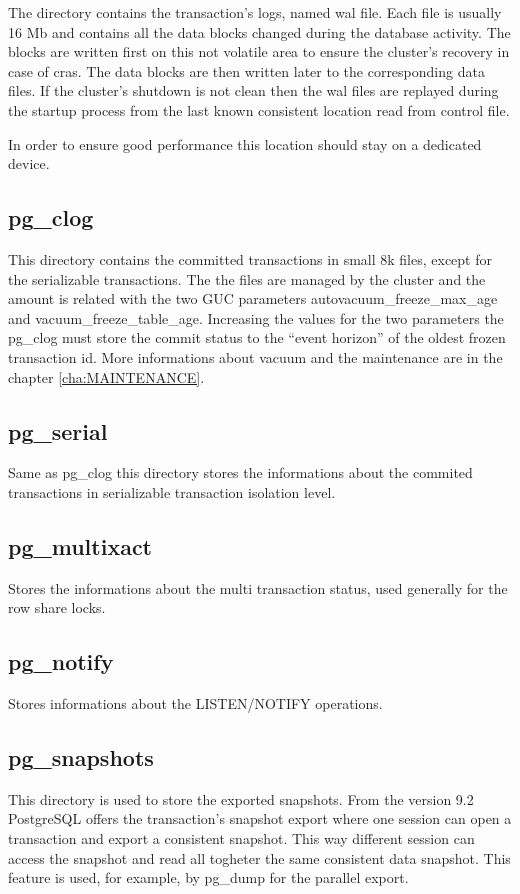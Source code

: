 The directory contains the transaction's logs,  named wal 
file. Each file is usually 16 Mb and contains all the data blocks changed during 
the database activity. 
The blocks are written first on this not volatile area to ensure the cluster's 
recovery in case of cras. The data blocks are then written later to the 
corresponding data files. If the cluster's shutdown is not clean then the wal 
files are replayed during the startup process from the last known consistent 
location read from control file.

In order to ensure good performance this location should stay on a dedicated 
device. 

\subsection{pg\_clog}
This directory contains the committed transactions in small 8k files, except 
for the serializable transactions.
The the files are managed by the cluster and the amount is related with 
the two GUC parameters autovacuum\_freeze\_max\_age and 
vacuum\_freeze\_table\_age.
Increasing the values for the two parameters the pg\_clog must store the commit 
status to the ``event horizon'' of the oldest frozen transaction id. 
More informations about vacuum and the maintenance are in 
the chapter \ref{cha:MAINTENANCE}.

\subsection{pg\_serial}
Same as pg\_clog this directory stores the informations about the commited 
transactions in serializable transaction isolation level.

\subsection{pg\_multixact}
Stores the informations about the multi transaction status, used generally for  
the row share locks.

\subsection{pg\_notify}
Stores informations about the LISTEN/NOTIFY operations.

\subsection{pg\_snapshots}
This directory is used to store the exported snapshots. From the version 9.2 
PostgreSQL offers the transaction's snapshot export where one session can 
open a transaction and export a consistent snapshot. This way different session 
can access the snapshot and read all togheter the same consistent data 
snapshot. This feature is used, for example, by pg\_dump for the parallel 
export.

